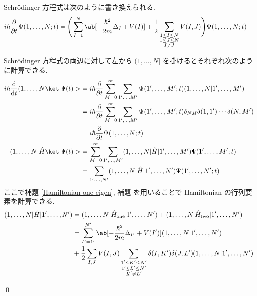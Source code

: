 \documentclass[uplatex,dvipdfmx,a4paper,11pt]{jlreq}
\makeatletter
\numberwithin{equation}{section}
\theoremstyle{definition}
\renewenvironment{proof}[1][\proofname]{\par
  \normalfont
  \topsep6\p@\@plus6\p@ \trivlist
  \item[\hskip\labelsep{\bfseries #1}\@addpunct{\bfseries}]\ignorespaces\quad\par
}{
  \qed\endtrivlist\@endpefalse
}
\renewcommand\proofname{証明}
\makeatother
\begin{document}
\begin{theorem}
  Schrödinger 方程式は次のように書き換えられる.
  \begin{align}
    i\hbar\diffp{}{t}\Psi(1,\ldots,N; t) & = \Bigg(\sum_{I = 1}^{N}\ab[-\frac{\hbar^2}{2m}\Delta_I + V(I)] + \frac{1}{2}\sum_{\substack{1\leq I\leq N \\ 1\leq J\leq N \\ I \neq J}}V(I, J)\Bigg)\Psi(1,\ldots,N; t)
  \end{align}
\end{theorem}
\begin{proof}
  Schrödinger 方程式の両辺に対して左から $(1,\ldots,N|$ を掛けるとそれぞれ次のように計算できる.
  \begin{align}
    i\hbar\diff{}{t}(1,\ldots,N\ket|\Psi(t)> & = i\hbar\diffp{}{t}\sum_{M = 0}^{\infty}\sum_{1',\ldots,M'}\Psi(1',\ldots,M'; t)(1,\ldots,N|1',\ldots,M')                   \\
                                             & = i\hbar\diffp{}{t}\sum_{M = 0}^{\infty}\sum_{1',\ldots,M'}\Psi(1',\ldots,M'; t)\delta_{NM}\delta(1, 1')\cdots\delta(N, M') \\
                                             & = i\hbar\diffp{}{t}\Psi(1,\ldots,N; t)                                                                                      \\
    (1,\ldots,N|\hat{H}\ket|\Psi(t)>         & = \sum_{M = 0}^{\infty}\sum_{1',\ldots,M'}(1,\ldots,N|\hat{H}|1',\ldots,M')\Psi(1',\ldots,M'; t)                            \\
                                             & = \sum_{1',\ldots,N'}(1,\ldots,N|\hat{H}|1',\ldots,N')\Psi(1',\ldots,N'; t)
  \end{align}
  ここで補題 \ref{Hamiltonian one eigen}, 補題  を用いることで Hamiltonian の行列要素を計算できる.
  \begin{align}
    (1,\ldots,N|\hat{H}|1',\ldots,N') & = (1,\ldots,N|\hat{H}_{\mathrm{one}}|1',\ldots,N') + (1,\ldots,N|\hat{H}_{\mathrm{two}}|1',\ldots,N')        \\
                                      & = \sum_{I' = 1'}^{N'}\ab[-\frac{\hbar^2}{2m}\Delta_{I'} + V(I')](1,\ldots,N|1',\ldots,N')                    \\
                                      & + \frac{1}{2}\sum_{I,J}V(I, J)\sum_{\substack{1'\leq K'\leq N'                                               \\ 1'\leq L'\leq N' \\ K' \neq L'}}\delta(I, K')\delta(J, L')(1,\ldots,N|1',\ldots,N') \\

\end{align}
\end{proof}
\end{document}
